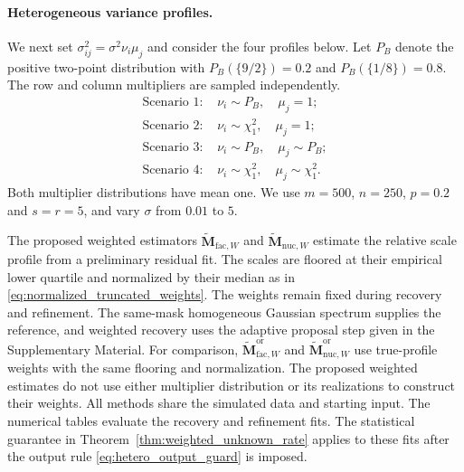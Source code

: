 \documentclass[numsec,webpdf,modern,large,namedate]{oup-authoring-template}
\theoremstyle{plain}
\theoremstyle{remark}
\newcommand{\M}{\bm{M}}
\newif\ifmarkchanges
\newenvironment{revision}{\begingroup\ifmarkchanges\color{red}\fi}{\endgroup}
\begin{document}
\begin{revision}
\paragraph{Heterogeneous variance profiles.}
\label{sec:heterogeneous_simulation}
We next set $\sigma_{ij}^2=\sigma^2\nu_i\mu_j$ and consider the four profiles below. Let $P_B$ denote the positive two-point distribution with $P_B(\{9/2\})=0.2$ and $P_B(\{1/8\})=0.8$. The row and column multipliers are sampled independently.
\begin{align*}
 \text{Scenario 1: }&\nu_i\sim P_B,\quad \mu_j=1;\\
 \text{Scenario 2: }&\nu_i\sim\chi_1^2,\quad \mu_j=1;\\
 \text{Scenario 3: }&\nu_i\sim P_B,\quad \mu_j\sim P_B;\\
 \text{Scenario 4: }&\nu_i\sim\chi_1^2,\quad \mu_j\sim\chi_1^2.
\end{align*}
Both multiplier distributions have mean one. We use $m=500$, $n=250$, $p=0.2$ and $s=r=5$, and vary $\sigma$ from $0.01$ to $5$.

The proposed weighted estimators $\widetilde{\M}_{\mathrm{fac},W}$ and $\widetilde{\M}_{\mathrm{nuc},W}$ estimate the relative scale profile from a preliminary residual fit. The scales are floored at their empirical lower quartile and normalized by their median as in \eqref{eq:normalized_truncated_weights}. The weights remain fixed during recovery and refinement. The same-mask homogeneous Gaussian spectrum supplies the reference, and weighted recovery uses the adaptive proposal step given in the Supplementary Material. For comparison, $\widetilde{\M}_{\mathrm{fac},W}^{\mathrm{or}}$ and $\widetilde{\M}_{\mathrm{nuc},W}^{\mathrm{or}}$ use true-profile weights with the same flooring and normalization. The proposed weighted estimates do not use either multiplier distribution or its realizations to construct their weights. All methods share the simulated data and starting input.
The numerical tables evaluate the recovery and refinement fits. The statistical guarantee in Theorem~\ref{thm:weighted_unknown_rate} applies to these fits after the output rule \eqref{eq:hetero_output_guard} is imposed.
\end{revision}
\end{document}
